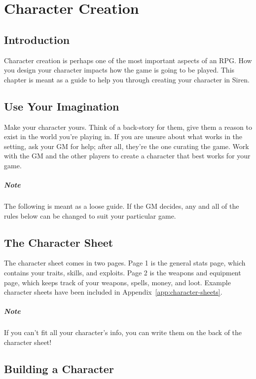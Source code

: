 \chapter{Character Creation}\label{chap:char-creat}
\section{Introduction}
Character creation is perhaps one of the most important aspects of an RPG.
How you design your character impacts how the game is going to be played.
This chapter is meant as a guide to help you through creating your character in Siren.

\section{Use Your Imagination}
Make your character yours.
Think of a back-story for them, give them a reason to exist in the world you're playing in.
If you are unsure about what works in the setting, ask your GM for help; after all, they're the one curating the game.
Work with the GM and the other players to create a character that best works for your game.

\paragraph{Note} The following is meant as a loose guide.
If the GM decides, any and all of the rules below can be changed to suit your particular game.

\section{The Character Sheet}
The character sheet comes in two pages.
Page 1 is the general stats page, which contains your traits, skills, and exploits.
Page 2 is the weapons and equipment page, which keeps track of your weapons, spells, money, and loot.
Example character sheets have been included in Appendix~\ref{app:character-sheets}.

\paragraph{Note} If you can't fit all your character's info, you can write them on the back of the character sheet!

\section{Building a Character}
